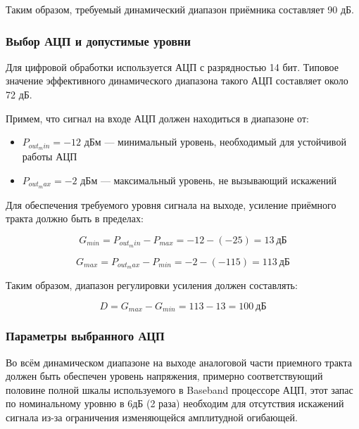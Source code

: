 \documentclass[a4paper,12pt]{article}
\begin{document}
Таким образом, требуемый динамический диапазон приёмника составляет 90 дБ.

\subsubsection{Выбор АЦП и допустимые уровни}
Для цифровой обработки используется АЦП с разрядностью 14 бит. Типовое значение эффективного динамического диапазона такого АЦП составляет около 72 дБ.

Примем, что сигнал на входе АЦП должен находиться в диапазоне от:
\begin{itemize}
\item $P_{out_min} = -12$ дБм — минимальный уровень, необходимый для устойчивой работы АЦП
\item $P_{out_max} = -2$ дБм — максимальный уровень, не вызывающий искажений
\end{itemize}


Для обеспечения требуемого уровня сигнала на выходе, усиление приёмного тракта должно быть в пределах:

\begin{equation}
G_{min} = P_{out_min} - P_{max} = -12 - (-25) = 13\ \text{дБ}
\end{equation}

\begin{equation}
G_{max} = P_{out_max} - P_{min} = -2 - (-115) = 113\ \text{дБ}
\end{equation}

Таким образом, диапазон регулировки усиления должен составлять:

\begin{equation}
D = G_{max} - G_{min} = 113 - 13 = 100\ \text{дБ}
\end{equation}




\subsubsection{Параметры выбранного АЦП}
Во всём динамическом диапазоне на выходе аналоговой части приемного тракта должен быть обеспечен уровень напряжения, примерно соответствующий половине полной шкалы используемого в Baseband процессоре АЦП, этот запас по номинальному уровню в 6дБ (2 раза) необходим для отсутствия искажений сигнала из-за ограничения изменяющейся амплитудной огибающей.  
\end{document}
